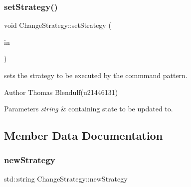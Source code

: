 \mbox{\label{class_change_strategy_a89736c13057de424436812378b921481}} 
\subsubsection{\texorpdfstring{setStrategy()}{setStrategy()}}
{\footnotesize\ttfamily void Change\+Strategy\+::set\+Strategy (\begin{DoxyParamCaption}\item[{std\+::string}]{in }\end{DoxyParamCaption})}



sets the strategy to be executed by the commmand pattern. 

\begin{DoxyAuthor}{Author}
Thomas Blendulf(u21446131) 
\end{DoxyAuthor}

\begin{DoxyParams}{Parameters}
{\em string} & containing state to be updated to. \\
\hline
\end{DoxyParams}


\subsection{Member Data Documentation}
\mbox{\label{class_change_strategy_a993c743ed246e161e16bced03c5fafad}} 
\subsubsection{\texorpdfstring{newStrategy}{newStrategy}}
{\footnotesize\ttfamily std\+::string Change\+Strategy\+::new\+Strategy}

